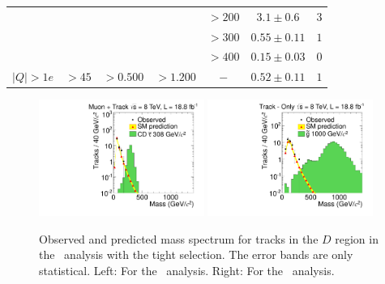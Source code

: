 \begin{table}
\begin{center}
\begin{tabular}{|l|c|c|c|c|cc|}
                        &                         &                            &                            & $> 200$   & $3.1\pm0.6$    & $3$  \\
                        &                         &                            &                            & $> 300$   & $0.55\pm0.11$  & $1$  \\
                        &                         &                            &                            & $> 400$   & $0.15\pm0.03$  & $0$ \\ \hline
$|Q|>1e$                &           $>45$         &       $> 0.500$            &        $> 1.200 $          &    $-$    & $0.52\pm 0.11$ & $1$ \\ \hline

 \end{tabular}
 \end{center}
\end{table}

\begin{figure}
 \begin{center}
  \includegraphics[clip=false, trim=0.0cm 0cm 0.0cm 0cm, width=0.48\textwidth]{figures/tkmu/RescaleNoRatio_Mass_8TeV_TightNoSMMC}
  \includegraphics[clip=false, trim=0.0cm 0cm 0.0cm 0cm, width=0.48\textwidth]{figures/tkonly/RescaleNoRatio_Mass_8TeV_TightNoSMMC}
 \end{center}
 \caption[Observed and predicted mass spectrum for tracks in the signal region with the final selection thresholds in the \tktof\ and \tkonly\ analyses.]
{Observed and predicted mass spectrum for tracks in the $D$ region in the \tktof\ analysis with the tight selection.
The error bands are only statistical. Left: For the \tktof\ analysis. Right: For the \tkonly\ analysis.}
\label{fig:TightMassDistribution}
\end{figure}